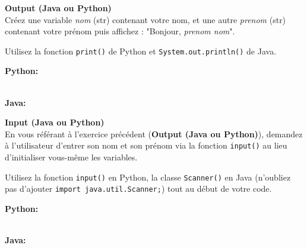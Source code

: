 \begin{Exercice}[5 minutes] \textbf{Output (Java ou Python)}\\
   Créez une variable \textit{nom} (str) contenant votre nom, et une autre \textit{prenom} (str) contenant votre prénom puis affichez : "Bonjour, \textit{prenom nom}". \\
   
    \begin{conseil}
        Utilisez la fonction \lstinline{print()} de Python et \lstinline{System.out.println()} de Java. 
        
    \end{conseil}
    \begin{solution}
    
    \textbf{Python:} 
    
    
    \textbf{\\Java:} 
      
       
        
    \end{solution}   
\end{Exercice}

\begin{Exercice}[5 minutes] \textbf{Input (Java ou Python)}\\
   En vous référant à l'exercice précédent (\textbf{Output (Java ou Python)}), demandez à l'utilisateur d'entrer son nom et son prénom via la fonction \lstinline{input()} au lieu d'initialiser vous-même les variables. \\
   
    \begin{conseil}
       Utilisez la fonction \lstinline{input()} en Python, la classe \lstinline{Scanner()} en Java (n'oubliez pas d'ajouter \lstinline{import java.util.Scanner;}) tout au début de votre code. 
        
    \end{conseil}
    \begin{solution}
    
    \textbf{Python:} 
    
    
    \textbf{\\Java:}
      
       
        
    \end{solution}   
\end{Exercice}

